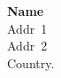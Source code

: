 \documentclass[a4paper]{article}
\begin{document}
\addresslabel[\tiny]
{\textbf{Name}\\Addr~1\\Addr~2\\Country.}
\end{document}
